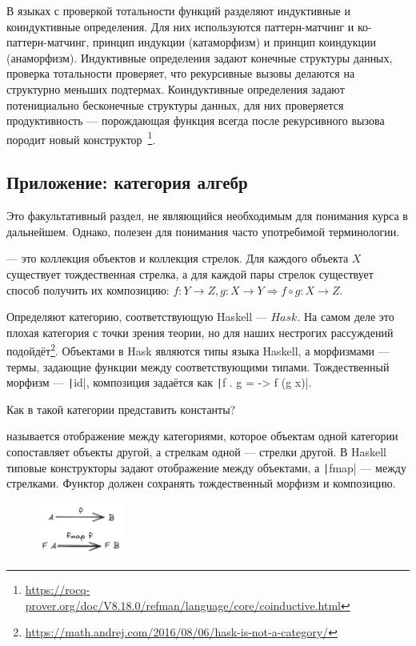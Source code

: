 В языках с проверкой тотальности функций разделяют индуктивные и коиндуктивные определения.
Для них используются паттерн-матчинг и ко-паттерн-матчинг, принцип индукции (катаморфизм) и принцип коиндукции (анаморфизм).
Индуктивные определения задают конечные структуры данных, проверка тотальности проверяет, что рекурсивные вызовы делаются на структурно меньших подтермах.
Коиндуктивные определения задают потенициально бесконечные структуры данных, для них проверяется продуктивность --- порождающая функция всегда после рекурсивного вызова породит новый конструктор~\footnote{\url{https://rocq-prover.org/doc/V8.18.0/refman/language/core/coinductive.html}}.


\subsection{Приложение: категория алгебр} \label{subsec:cats}

Это факультативный раздел, не являющийся необходимым для понимания курса в дальнейшем.
Однако, полезен для понимания часто употребимой терминологии.

 --- это коллекция объектов и коллекция стрелок.
Для каждого объекта $X$ существует тождественная стрелка, а для каждой пары стрелок существует способ получить их композицию: $f : Y \to Z, g : X \to Y \Rightarrow f \circ g : X \to Z$.

Определяют категорию, соответствующую Haskell --- $Hask$.
На самом деле это плохая категория с точки зрения теории, но для наших нестрогих рассуждений подойдёт\footnote{\url{https://math.andrej.com/2016/08/06/hask-is-not-a-category/}}.
Объектами в Hask являются типы языка Haskell, а морфизмами --- термы, задающие функции между соответствующими типами.
Тождественный морфизм --- \texttt|id|, композиция задаётся как \texttt|f . g = \x -> f (g x)|.

\begin{task}
    Как в такой категории представить константы?
\end{task}

 называется отображение между категориями, которое объектам одной категории сопоставляет объекты другой, а стрелкам одной --- стрелки другой.
В Haskell типовые конструкторы задают отображение между объектами, а \texttt|fmap| --- между стрелками.
Функтор должен сохранять тождественный морфизм и композицию.
\begin{figure}[h!]
    \centering
    \includegraphics[width=0.25\textwidth]{figs/functor}
\end{figure}

